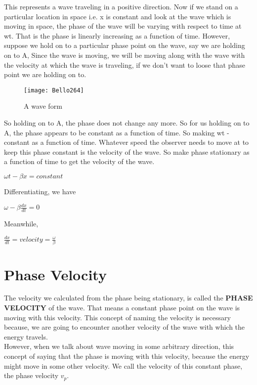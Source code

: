 		This represents a wave traveling in a positive direction. Now if we stand on a particular location in space i.e. x is constant and look at the wave which is moving in space, the phase of the wave will be varying with respect to time at wt. That is the phase is linearly increasing as a function of time. However, suppose we hold on to a particular phase point on the wave, say we are holding on to A, Since the wave is moving, we will be moving along with the wave with the velocity at which the wave is traveling, if we don't want to loose that phase point we are holding on to.\\
\begin{figure}[h]
	\centering
	\texttt{[image: Bello264]}
	\caption{A wave form}
\end{figure}
		 So holding on to A, the phase does not change any more. So for us holding on to A, the phase appears to be constant as a function of time. So making wt -   constant as a function of time. Whatever speed the observer needs to move at to keep this phase constant is the velocity of the wave. So make phase stationary as a function of time to get the velocity of the wave.
		\begin{center}
		$\omega t-\beta x = constant$
	\end{center}
		
		Differentiating, we have
		\begin{center}
		$\omega-\beta\frac{dx}{dt}=0$
	\end{center}
		
		Meanwhile, 
		\begin{center}
		$\frac{dx}{dt}=velocity=\frac{\omega}{\beta}$
	\end{center}
		
		\section{\textbf{Phase Velocity}}
		The velocity we calculated from the phase being stationary, is called the \textbf{PHASE VELOCITY} of the wave. That means a constant phase point on the wave is moving with this velocity. This concept of naming the velocity is necessary because, we are going to encounter another velocity of the wave with which the energy travels.\\
		
		However, when we talk about wave moving in some arbitrary direction, this concept of saying that the phase is moving with this velocity, because the energy might move in some other velocity. We call the velocity of this constant phase, the phase velocity $ v_p $.
		
